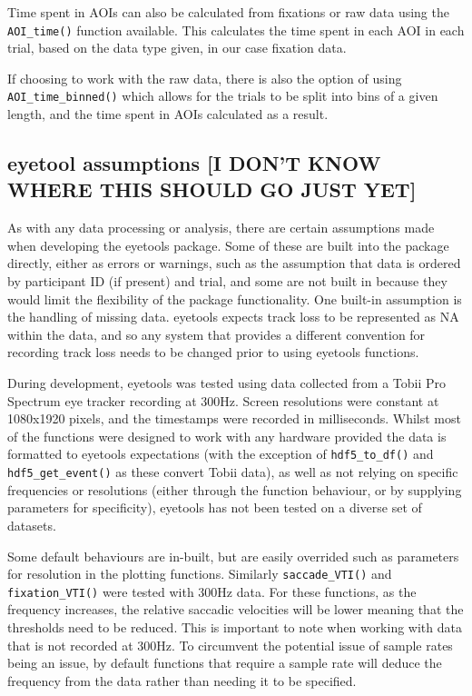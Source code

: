 \documentclass[
  man,
  floatsintext,
  longtable,
  nolmodern,
  notxfonts,
  notimes,
  colorlinks=true,linkcolor=blue,citecolor=blue,urlcolor=blue]{apa7}
\begin{document}
Time spent in AOIs can also be calculated from fixations or raw data
using the \texttt{AOI\_time()} function available. This calculates the
time spent in each AOI in each trial, based on the data type given, in
our case fixation data.

If choosing to work with the raw data, there is also the option of using
\texttt{AOI\_time\_binned()} which allows for the trials to be split
into bins of a given length, and the time spent in AOIs calculated as a
result.

\subsection{eyetool assumptions {[}I DON'T KNOW WHERE THIS SHOULD GO
JUST
YET{]}}\label{eyetool-assumptions-i-dont-know-where-this-should-go-just-yet}

As with any data processing or analysis, there are certain assumptions
made when developing the eyetools package. Some of these are built into
the package directly, either as errors or warnings, such as the
assumption that data is ordered by participant ID (if present) and
trial, and some are not built in because they would limit the
flexibility of the package functionality. One built-in assumption is the
handling of missing data. eyetools expects track loss to be represented
as NA within the data, and so any system that provides a different
convention for recording track loss needs to be changed prior to using
eyetools functions.

During development, eyetools was tested using data collected from a
Tobii Pro Spectrum eye tracker recording at 300Hz. Screen resolutions
were constant at 1080x1920 pixels, and the timestamps were recorded in
milliseconds. Whilst most of the functions were designed to work with
any hardware provided the data is formatted to eyetools expectations
(with the exception of \texttt{hdf5\_to\_df()} and
\texttt{hdf5\_get\_event()} as these convert Tobii data), as well as not
relying on specific frequencies or resolutions (either through the
function behaviour, or by supplying parameters for specificity),
eyetools has not been tested on a diverse set of datasets.

Some default behaviours are in-built, but are easily overrided such as
parameters for resolution in the plotting functions. Similarly
\texttt{saccade\_VTI()} and \texttt{fixation\_VTI()} were tested with
300Hz data. For these functions, as the frequency increases, the
relative saccadic velocities will be lower meaning that the thresholds
need to be reduced. This is important to note when working with data
that is not recorded at 300Hz. To circumvent the potential issue of
sample rates being an issue, by default functions that require a sample
rate will deduce the frequency from the data rather than needing it to
be specified.
\end{document}

